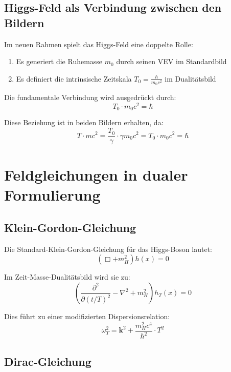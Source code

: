 \documentclass[a4paper,12pt]{article}
\begin{document}
	\subsection{Higgs-Feld als Verbindung zwischen den Bildern}
	
	Im neuen Rahmen spielt das Higgs-Feld eine doppelte Rolle:
	\begin{enumerate}
		\item Es generiert die Ruhemasse $m_0$ durch seinen VEV im Standardbild
		\item Es definiert die intrinsische Zeitskala $T_0 = \frac{\hbar}{m_0 c^2}$ im Dualitätsbild
	\end{enumerate}
	
	Die fundamentale Verbindung wird ausgedrückt durch:
	\begin{equation}
		T_0 \cdot m_0 c^2 = \hbar
	\end{equation}
	
	Diese Beziehung ist in beiden Bildern erhalten, da:
	\begin{equation}
		T \cdot m c^2 = \frac{T_0}{\gamma} \cdot \gamma m_0 c^2 = T_0 \cdot m_0 c^2 = \hbar
	\end{equation}
	\section{Feldgleichungen in dualer Formulierung}
	
	\subsection{Klein-Gordon-Gleichung}
	
	Die Standard-Klein-Gordon-Gleichung für das Higgs-Boson lautet:
	\begin{equation}
		(\Box + m_H^2) h(x) = 0
	\end{equation}
	
	Im Zeit-Masse-Dualitätsbild wird sie zu:
	\begin{equation}
		\left(\frac{\partial^2}{\partial(t/T)^2} - \nabla^2 + m_H^2\right) h_T(x) = 0
	\end{equation}
	
	Dies führt zu einer modifizierten Dispersionsrelation:
	\begin{equation}
		\omega_T^2 = \mathbf{k}^2 + \frac{m_H^2 c^4}{\hbar^2} \cdot T^2
	\end{equation}
	
	\subsection{Dirac-Gleichung}
	
\end{document}
